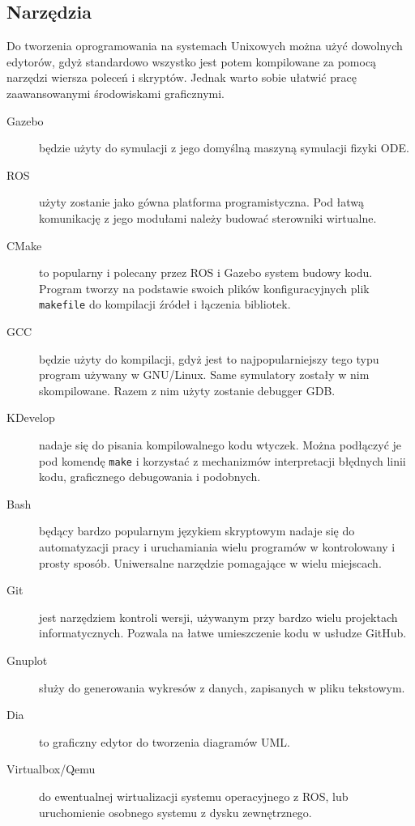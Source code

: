 	\subsection{Narzędzia}
	Do tworzenia oprogramowania na systemach Unixowych można użyć dowolnych edytorów, gdyż standardowo wszystko jest potem kompilowane za pomocą narzędzi wiersza poleceń i skryptów.
	Jednak warto sobie ułatwić pracę zaawansowanymi środowiskami graficznymi.
	\begin{description}
	\item[Gazebo] będzie użyty do symulacji z jego domyślną maszyną symulacji fizyki ODE.
	\item[ROS] użyty zostanie jako gówna platforma programistyczna. Pod łatwą komunikację z jego modułami należy budować sterowniki wirtualne.
	\item[CMake] to popularny i polecany przez ROS i Gazebo system budowy kodu. Program tworzy na podstawie swoich plików konfiguracyjnych plik \texttt{makefile} do kompilacji źródeł i łączenia bibliotek.
	\item[GCC] będzie użyty do kompilacji, gdyż jest to najpopularniejszy tego typu program używany w GNU/Linux. Same symulatory zostały w nim skompilowane.
	Razem z nim użyty zostanie debugger GDB. 
	\item[KDevelop] nadaje się do pisania kompilowalnego kodu wtyczek. Można podłączyć je pod komendę \texttt{make} i korzystać z mechanizmów interpretacji błędnych linii kodu, graficznego debugowania i podobnych.
	\item[Bash] będący bardzo popularnym językiem skryptowym nadaje się do automatyzacji pracy i uruchamiania wielu programów w kontrolowany i prosty sposób.
	Uniwersalne narzędzie pomagające w wielu miejscach.
	\item[Git] jest narzędziem kontroli wersji, używanym przy bardzo wielu projektach informatycznych. Pozwala na łatwe umieszczenie kodu w usłudze GitHub.
	\item[Gnuplot] służy do generowania wykresów z danych, zapisanych w pliku tekstowym.
	\item[Dia] to graficzny edytor do tworzenia diagramów UML.
	\item[Virtualbox/Qemu] do ewentualnej wirtualizacji systemu operacyjnego z ROS, lub uruchomienie osobnego systemu z dysku zewnętrznego.
	\end{description}

